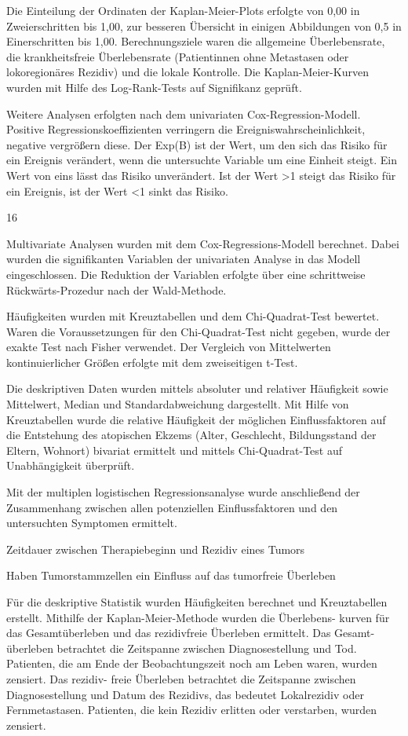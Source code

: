 Die Einteilung der Ordinaten der Kaplan-Meier-Plots erfolgte von 0,00 in Zweierschritten bis 1,00, zur besseren Übersicht in einigen Abbildungen von 0,5 in Einerschritten bis 1,00. Berechnungsziele waren die allgemeine Überlebensrate, die krankheitsfreie Überlebensrate (Patientinnen ohne Metastasen oder lokoregionäres Rezidiv) und die lokale Kontrolle. Die Kaplan-Meier-Kurven wurden mit Hilfe des Log-Rank-Tests auf Signifikanz geprüft.

Weitere Analysen erfolgten nach dem univariaten Cox-Regression-Modell. Positive Regressionskoeffizienten verringern die Ereigniswahrscheinlichkeit, negative vergrößern diese. Der Exp(B) ist der Wert, um den sich das Risiko für ein Ereignis verändert, wenn die untersuchte Variable um eine Einheit steigt. Ein Wert von eins lässt das Risiko unverändert. Ist der Wert \textgreater1 steigt das Risiko für ein Ereignis, ist der Wert \textless1 sinkt das Risiko.

16

Multivariate Analysen wurden mit dem Cox-Regressions-Modell berechnet. Dabei wurden die signifikanten Variablen der univariaten Analyse in das Modell eingeschlossen. Die Reduktion der Variablen erfolgte über eine schrittweise Rückwärts-Prozedur nach der Wald-Methode.

Häufigkeiten wurden mit Kreuztabellen und dem Chi-Quadrat-Test bewertet. Waren die Voraussetzungen für den Chi-Quadrat-Test nicht gegeben, wurde der exakte Test nach Fisher verwendet. Der Vergleich von Mittelwerten kontinuierlicher Größen erfolgte mit dem zweiseitigen t-Test.

Die deskriptiven Daten wurden mittels absoluter und relativer Häufigkeit sowie Mittelwert, Median und Standardabweichung dargestellt. Mit Hilfe von Kreuztabellen wurde die relative Häufigkeit der möglichen Einflussfaktoren auf die Entstehung des atopischen Ekzems (Alter, Geschlecht, Bildungsstand der Eltern, Wohnort) bivariat ermittelt und mittels Chi-Quadrat-Test auf Unabhängigkeit überprüft.

Mit der multiplen logistischen Regressionsanalyse wurde anschließend der Zusammenhang zwischen allen potenziellen Einflussfaktoren und den untersuchten Symptomen ermittelt.

Zeitdauer zwischen Therapiebeginn und Rezidiv eines Tumors

Haben Tumorstammzellen ein Einfluss auf das tumorfreie Überleben

Für die deskriptive Statistik wurden Häufigkeiten berechnet und Kreuztabellen erstellt. Mithilfe der Kaplan-Meier-Methode wurden die Überlebens- kurven für das Gesamtüberleben und das rezidivfreie Überleben ermittelt. Das Gesamt- überleben betrachtet die Zeitspanne zwischen Diagnosestellung und Tod. Patienten, die am Ende der Beobachtungszeit noch am Leben waren, wurden zensiert. Das rezidiv- freie Überleben betrachtet die Zeitspanne zwischen Diagnosestellung und Datum des Rezidivs, das bedeutet Lokalrezidiv oder Fernmetastasen. Patienten, die kein Rezidiv erlitten oder verstarben, wurden zensiert.


